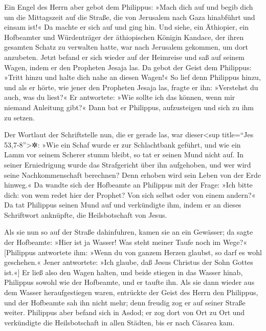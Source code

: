  Ein Engel des Herrn aber gebot dem Philippus: »Mach dich
auf und begib dich um die Mittagszeit auf die Straße, die von Jerusalem
nach Gaza hinabführt und einsam ist!«  Da machte er sich
auf und ging hin. Und siehe, ein Äthiopier, ein Hofbeamter und
Würdenträger der äthiopischen Königin Kandace, der ihren gesamten Schatz
zu verwalten hatte, war nach Jerusalem gekommen, um dort anzubeten.
 Jetzt befand er sich wieder auf der Heimreise und saß
auf seinem Wagen, indem er den Propheten Jesaja las.  Da
gebot der Geist dem Philippus: »Tritt hinzu und halte dich nahe an
diesen Wagen!«  So lief denn Philippus hinzu, und als er
hörte, wie jener den Propheten Jesaja las, fragte er ihn: »Verstehst du
auch, was du liest?«  Er antwortete: »Wie sollte ich das
können, wenn mir niemand Anleitung gibt?« Dann bat er Philippus,
aufzusteigen und sich zu ihm zu setzen.

 Der Wortlaut der Schriftstelle nun, die er gerade las,
war dieser\textless sup title=``Jes 53,7-8''\textgreater✲: »Wie ein
Schaf wurde er zur Schlachtbank geführt, und wie ein Lamm vor seinem
Scherer stumm bleibt, so tat er seinen Mund nicht auf. 
In seiner Erniedrigung wurde das Strafgericht über ihn aufgehoben, und
wer wird seine Nachkommenschaft berechnen? Denn erhoben wird sein Leben
von der Erde hinweg.«  Da wandte sich der Hofbeamte an
Philippus mit der Frage: »Ich bitte dich: von wem redet hier der
Prophet? Von sich selbst oder von einem andern?«  Da tat
Philippus seinen Mund auf und verkündigte ihm, indem er an dieses
Schriftwort anknüpfte, die Heilsbotschaft von Jesus.

 Als sie nun so auf der Straße dahinfuhren, kamen sie an
ein Gewässer; da sagte der Hofbeamte: »Hier ist ja Wasser! Was steht
meiner Taufe noch im Wege?«  {[}Philippus antwortete ihm:
»Wenn du von ganzem Herzen glaubst, so darf es wohl geschehen.« Jener
antwortete: »Ich glaube, daß Jesus Christus der Sohn Gottes ist.«{]}
 Er ließ also den Wagen halten, und beide stiegen in das
Wasser hinab, Philippus sowohl wie der Hofbeamte, und er taufte ihn.
 Als sie dann wieder aus dem Wasser heraufgestiegen
waren, entrückte der Geist des Herrn den Philippus, und der Hofbeamte
sah ihn nicht mehr; denn freudig zog er auf seiner Straße weiter.
 Philippus aber befand sich in Asdod; er zog dort von Ort
zu Ort und verkündigte die Heilsbotschaft in allen Städten, bis er nach
Cäsarea kam.

